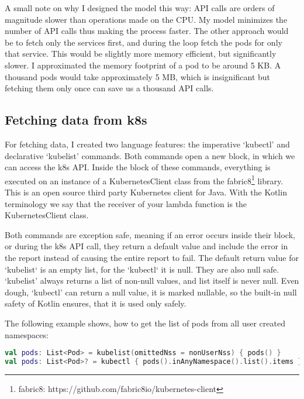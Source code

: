 A small note on why I designed the model this way: API calls are orders of magnitude slower than operations made on the CPU. My model minimizes the number of API calls thus making the process faster. The other approach would be to fetch only the services first, and during the loop fetch the pods for only that service. This would be slightly more memory efficient, but significantly slower. I approximated the memory footprint of a pod to be around 5 KB. A thousand pods would take approximately 5 MB, which is insignificant but fetching them only once can save us a thousand API calls.

\subsection{Fetching data from k8s}

For fetching data, I created two language features: the imperative `kubectl' and declarative `kubelist' commands. Both commands open a new block, in which we can access the k8s API. Inside the block of these commands, everything is executed on an instance of a KubernetesClient class from the fabric8\footnote{fabric8: https://github.com/fabric8io/kubernetes-client} library. This is an open source third party Kubernetes client for Java. With the Kotlin terminology we say that the receiver of your lambda function is the KubernetesClient class.

Both commands are exception safe, meaning if an error occurs inside their block, or during the k8s API call, they return a default value and include the error in the report instead of causing the entire report to fail. The default return value for `kubelist` is an empty list, for the `kubectl` it is null. They are also null safe. `kubelist' always returns a list of non-null values, and list itself is never null. Even dough, `kubectl' can return a null value, it is marked nullable, so the built-in null safety of Kotlin ensures, that it is used only safely.

The following example shows, how to get the list of pods from all user created namespaces:

\begin{lstlisting}[caption={Usage of kubelist and kubectl},language=Kotlin,label=code:kubelist_usage]
val pods: List<Pod> = kubelist(omittedNss = nonUserNss) { pods() }
val pods: List<Pod>? = kubectl { pods().inAnyNamespace().list().items }?.filter { it.metadata.namespace !in nonUserNss }
\end{lstlisting}

